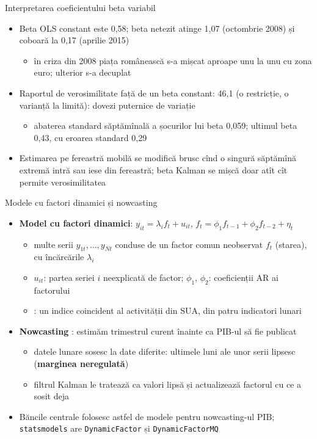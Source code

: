 \begin{frame}{Interpretarea coeficientului beta variabil}
\itemsize{\small}
\begin{itemize}
    \item Beta OLS constant este 0{,}58; beta netezit atinge 1{,}07 (octombrie 2008) și coboară la 0{,}17 (aprilie 2015)
    \begin{itemize}
        \item în criza din 2008 piața românească s-a mișcat aproape unu la unu cu zona euro; ulterior s-a decuplat
    \end{itemize}
    \item Raportul de verosimilitate față de un beta constant: 46{,}1 (o restricție, o varianță la limită): dovezi puternice de variație
    \begin{itemize}
        \item abaterea standard săptămînală a șocurilor lui beta 0{,}059; ultimul beta 0{,}43, cu eroarea standard 0{,}29
    \end{itemize}
    \item Estimarea pe fereastră mobilă se modifică brusc cînd o singură săptămînă extremă intră sau iese din fereastră; beta Kalman se mișcă doar atît cît permite verosimilitatea
\end{itemize}
\end{frame}

\begin{frame}{Modele cu factori dinamici și nowcasting}
\itemsize{\small}
\begin{itemize}
    \item \textbf{Model cu factori dinamici}: $y_{it} = \lambda_if_t + u_{it}$, \quad $f_t = \phi_1f_{t-1} + \phi_2f_{t-2} + \eta_t$
    \begin{itemize}
        \item multe serii $y_{1t}, \dots, y_{Nt}$ conduse de un factor comun neobservat $f_t$ (starea), cu încărcările $\lambda_i$
        \item $u_{it}$: partea seriei $i$ neexplicată de factor; $\phi_1$, $\phi_2$: coeficienții AR ai factorului
        \item {}: un indice coincident al activității din SUA, din patru indicatori lunari
    \end{itemize}
    \item \textbf{Nowcasting} : estimăm trimestrul curent înainte ca PIB-ul să fie publicat
    \begin{itemize}
        \item datele lunare sosesc la date diferite: ultimele luni ale unor serii lipsesc (\textbf{marginea neregulată})
        \item filtrul Kalman le tratează ca valori lipsă și actualizează factorul cu ce a sosit deja
    \end{itemize}
    \item Băncile centrale folosesc astfel de modele pentru nowcasting-ul PIB; \texttt{statsmodels} are \texttt{DynamicFactor} și \texttt{DynamicFactorMQ}
\end{itemize}
\end{frame}

